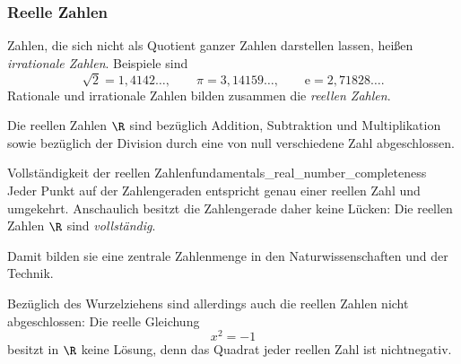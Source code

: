 \subsubsection{Reelle Zahlen}
\label{subsubsec:fundamentals_real_numbers}

Zahlen, die sich nicht als Quotient ganzer Zahlen darstellen lassen, heißen
\emph{irrationale Zahlen}. Beispiele sind
\[
  \sqrt2=1{,}4142\ldots,
  \qquad
  \pi=3{,}14159\ldots,
  \qquad
  \mathrm e=2{,}71828\ldots.
\]
Rationale und irrationale Zahlen bilden zusammen die \emph{reellen Zahlen}.

\begin{center}
  \begingroup
    \def\NumberSetStage{4}
  \endgroup
\end{center}

Die reellen Zahlen $\R$ sind bezüglich Addition, Subtraktion und Multiplikation
sowie bezüglich der Division durch eine von null verschiedene Zahl
abgeschlossen.

\begin{KeyPointBox}{Vollständigkeit der reellen Zahlen}{fundamentals_real_number_completeness}
  Jeder Punkt auf der Zahlengeraden entspricht genau einer reellen Zahl und
  umgekehrt. Anschaulich besitzt die Zahlengerade daher keine Lücken: Die
  reellen Zahlen $\R$ sind \emph{vollständig}.
  \begin{center}
  \end{center}
   Damit bilden sie eine zentrale Zahlenmenge in den Naturwissenschaften und der Technik.
\end{KeyPointBox}

Bezüglich des Wurzelziehens sind allerdings auch die reellen Zahlen nicht abgeschlossen:
Die reelle Gleichung
\[
  x^2=-1
\]
besitzt in $\R$ keine Lösung, denn das Quadrat jeder reellen Zahl ist
nichtnegativ.


